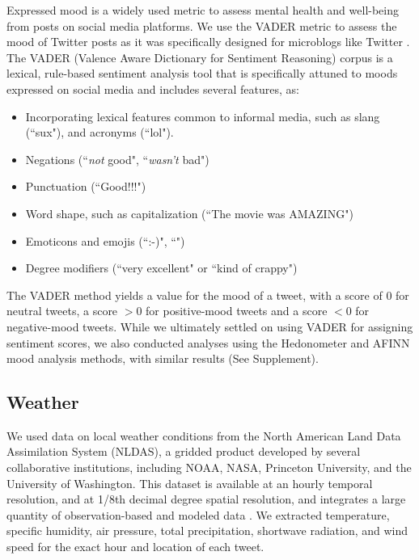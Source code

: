 \documentclass[titlepage]{article}
\begin{document}
Expressed mood is a widely used metric to assess mental health and well-being from posts on social media platforms. We use the VADER metric to assess the mood of Twitter posts as it was specifically designed for microblogs like Twitter \citep{hutto2014vader}. The VADER (Valence Aware Dictionary for Sentiment Reasoning) corpus \citep{gilbert_vader_2014} is a lexical, rule-based sentiment analysis tool that is specifically attuned to moods expressed on social media and includes several features, as:

\begin{itemize}
 \item Incorporating lexical features common to informal media, such as slang (``sux"), and acronyms (``lol").
 \item Negations (``\textit{not} good", ``\textit{wasn't} bad")
 \item Punctuation (``Good!!!")
 \item Word shape, such as capitalization (``The movie was AMAZING")
 \item Emoticons and emojis (``:-)", ``\emojismile")
 \item Degree modifiers (``very excellent" or ``kind of crappy")
\end{itemize} 

The VADER method yields a value for the mood of a tweet, with a score of 0 for neutral tweets, a score $> 0$ for positive-mood tweets and a score $< 0$ for negative-mood tweets. While we ultimately settled on using VADER for assigning sentiment scores, we also conducted analyses using the Hedonometer and AFINN mood analysis methods, with similar results (See Supplement).

\subsection*{Weather}
We used data on local weather conditions from the North American Land Data Assimilation System (NLDAS), a gridded product developed by several collaborative institutions, including NOAA, NASA, Princeton University, and the University of Washington. This dataset is available at an hourly temporal resolution, and at 1/8th decimal degree spatial resolution, and integrates a large quantity of observation-based and modeled data \citep{xia_continental-scale_2012}. We extracted temperature, specific humidity, air pressure, total precipitation, shortwave radiation, and wind speed for the exact hour and location of each tweet. 
\end{document}
